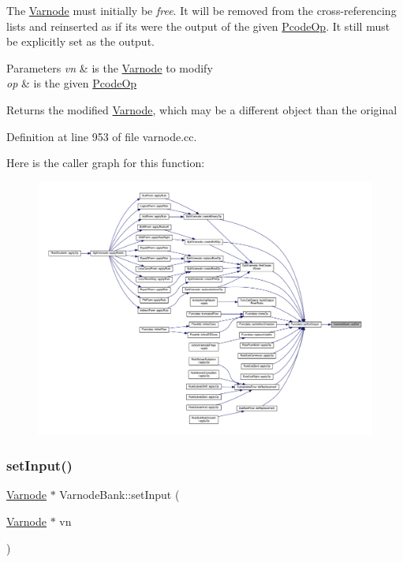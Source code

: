 The \mbox{\hyperlink{class_varnode}{Varnode}} must initially be {\itshape free}. It will be removed from the cross-\/referencing lists and reinserted as if its were the output of the given \mbox{\hyperlink{class_pcode_op}{Pcode\+Op}}. It still must be explicitly set as the output. 
\begin{DoxyParams}{Parameters}
{\em vn} & is the \mbox{\hyperlink{class_varnode}{Varnode}} to modify \\
\hline
{\em op} & is the given \mbox{\hyperlink{class_pcode_op}{Pcode\+Op}} \\
\hline
\end{DoxyParams}
\begin{DoxyReturn}{Returns}
the modified \mbox{\hyperlink{class_varnode}{Varnode}}, which may be a different object than the original 
\end{DoxyReturn}


Definition at line 953 of file varnode.\+cc.

Here is the caller graph for this function\+:
\nopagebreak
\begin{figure}[H]
\begin{center}
\leavevmode
\includegraphics[width=350pt]{class_varnode_bank_ac151db372e9299db20ad0808140877e1_icgraph}
\end{center}
\end{figure}
\mbox{\label{class_varnode_bank_a132b64906ef393d34a4363ff816e4ba2}} 
\subsubsection{\texorpdfstring{setInput()}{setInput()}}
{\footnotesize\ttfamily \mbox{\hyperlink{class_varnode}{Varnode}} $\ast$ Varnode\+Bank\+::set\+Input (\begin{DoxyParamCaption}\item[{\mbox{\hyperlink{class_varnode}{Varnode}} $\ast$}]{vn }\end{DoxyParamCaption})}



